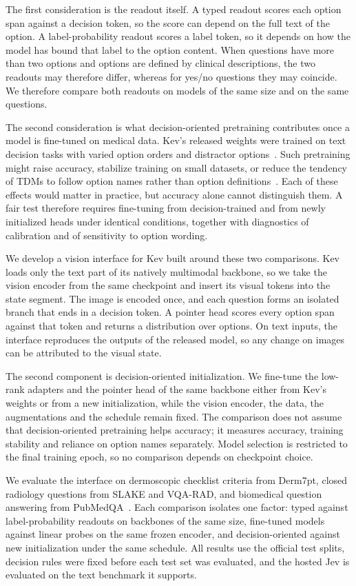 \documentclass{article}
\begin{document}
The first consideration is the readout itself. A typed readout scores each option span against a decision token, so the score can depend on the full text of the option. A label-probability readout scores a label token, so it depends on how the model has bound that label to the option content. When questions have more than two options and options are defined by clinical descriptions, the two readouts may therefore differ, whereas for yes/no questions they may coincide. We therefore compare both readouts on models of the same size and on the same questions.

The second consideration is what decision-oriented pretraining contributes once a model is fine-tuned on medical data. Kev's released weights were trained on text decision tasks with varied option orders and distractor options~\citep{palmer2026kev}. Such pretraining might raise accuracy, stabilize training on small datasets, or reduce the tendency of TDMs to follow option names rather than option definitions~\citep{sun2026typesafe}. Each of these effects would matter in practice, but accuracy alone cannot distinguish them. A fair test therefore requires fine-tuning from decision-trained and from newly initialized heads under identical conditions, together with diagnostics of calibration and of sensitivity to option wording.

We develop a vision interface for Kev built around these two comparisons. Kev loads only the text part of its natively multimodal backbone, so we take the vision encoder from the same checkpoint and insert its visual tokens into the state segment. The image is encoded once, and each question forms an isolated branch that ends in a decision token. A pointer head scores every option span against that token and returns a distribution over options. On text inputs, the interface reproduces the outputs of the released model, so any change on images can be attributed to the visual state.

The second component is decision-oriented initialization. We fine-tune the low-rank adapters and the pointer head of the same backbone either from Kev's weights or from a new initialization, while the vision encoder, the data, the augmentations and the schedule remain fixed. The comparison does not assume that decision-oriented pretraining helps accuracy; it measures accuracy, training stability and reliance on option names separately. Model selection is restricted to the final training epoch, so no comparison depends on checkpoint choice.

We evaluate the interface on dermoscopic checklist criteria from Derm7pt, closed radiology questions from SLAKE and VQA-RAD, and biomedical question answering from PubMedQA~\citep{kawahara2019derm7pt,jin2019pubmedqa}. Each comparison isolates one factor: typed against label-probability readouts on backbones of the same size, fine-tuned models against linear probes on the same frozen encoder, and decision-oriented against new initialization under the same schedule. All results use the official test splits, decision rules were fixed before each test set was evaluated, and the hosted Jev is evaluated on the text benchmark it supports.
\end{document}
